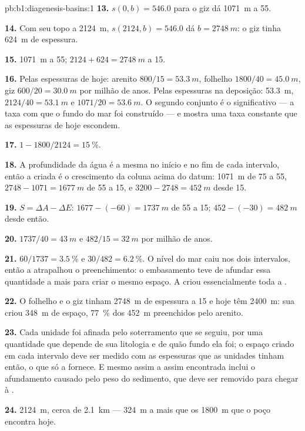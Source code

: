 \begin{solution}{pb:b1:diagenesis-basins:1}
\textbf{13.} $s(0, b) = 546.0$ para o giz dá \qty{1071}{m} a \qty{55}{\Ma}.

\textbf{14.} Com seu topo a \qty{2124}{m}, $s(2124, b) = 546.0$ dá $b =
\qty{2748}{m}$: o giz tinha \qty{624}{m} de espessura.

\textbf{15.} \qty{1071}{m} a \qty{55}{\Ma}; $2124 + 624 = \qty{2748}{m}$ a \qty{15}{\Ma}.

\textbf{16.} Pelas espessuras de hoje: arenito $800/15 = \qty{53.3}{m}$, folhelho
$1800/40 = \qty{45.0}{m}$, giz $600/20 = \qty{30.0}{m}$ por milhão de anos. Pelas
espessuras na deposição: \qty{53.3}{m}, $2124/40 =
\qty{53.1}{m}$ e $1071/20 = \qty{53.6}{m}$. O segundo conjunto é o significativo --- a
taxa com que o fundo do mar foi construído --- e mostra uma taxa constante que as
espessuras de hoje escondem.

\textbf{17.} $1 - 1800/2124 = \qty{15}{\%}$.

\textbf{18.} A profundidade da água é a mesma no início e no fim de cada intervalo, então a
 criada é o crescimento da coluna acima do datum: \qty{1071}{m} de 75 a
\qty{55}{\Ma}, $2748 - 1071 = \qty{1677}{m}$ de 55 a \qty{15}{\Ma}, e
$3200 - 2748 = \qty{452}{m}$ desde \qty{15}{\Ma}.

\textbf{19.} $S = \Delta A - \Delta E$: $1677 - (-60) = \qty{1737}{m}$ de 55 a
\qty{15}{\Ma}; $452 - (-30) = \qty{482}{m}$ desde então.

\textbf{20.} $1737/40 = \qty{43}{m}$ e $482/15 = \qty{32}{m}$ por milhão de anos.

\textbf{21.} $60/1737 = \qty{3.5}{\%}$ e $30/482 = \qty{6.2}{\%}$. O nível do mar caiu nos
dois intervalos, então a  atrapalhou o preenchimento: o embasamento teve de afundar
essa quantidade a mais para criar o mesmo espaço. A  criou essencialmente toda a
.

\textbf{22.} O folhelho e o giz tinham \qty{2748}{m} de espessura a \qty{15}{\Ma} e hoje têm
\qty{2400}{m}: sua  criou \qty{348}{m} de espaço, \qty{77}{\%} dos \qty{452}{m}
preenchidos pelo arenito.

\textbf{23.} Cada unidade foi afinada pelo soterramento que se seguiu, por uma quantidade que
depende de sua litologia e de quão fundo ela foi; o espaço criado em cada intervalo deve ser
medido com as espessuras que as unidades tinham então, o que só a  fornece. E
mesmo assim a  assim encontrada inclui o afundamento causado pelo peso do
sedimento, que deve ser removido para chegar à .

\textbf{24.} \qty{2124}{m}, cerca de \qty{2.1}{km} --- \qty{324}{m} a mais que os
\qty{1800}{m} que o poço encontra hoje.
\end{solution}
